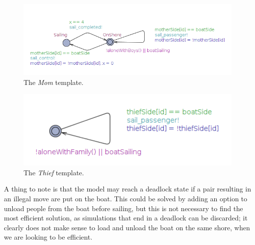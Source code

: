 \begin{figure}[H] \centering
	\includegraphics[width=1\textwidth]{Images/mom.png}
	\caption{The \textit{Mom} template.}\label{fig:mom}
\end{figure} 

\begin{figure}[H] \centering
	\includegraphics[width=1\textwidth]{Images/thief.png}
	\caption{The \textit{Thief} template.}\label{fig:thief}
\end{figure} 

A thing to note is that the model may reach a deadlock state if a pair resulting in an illegal move are put on the boat. This could be solved by adding an option to unload people from the boat before sailing, but this is not necessary to find the most efficient solution, as simulations that end in a deadlock can be discarded; it clearly does not make sense to load and unload the boat on the same shore, when we are looking to be efficient.